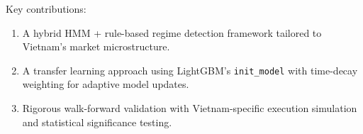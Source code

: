 \documentclass[12pt,a4paper]{article}
\begin{document}
Key contributions:
\begin{enumerate}
    \item A hybrid HMM + rule-based regime detection framework tailored
          to Vietnam's market microstructure.
    \item A transfer learning approach using LightGBM's \texttt{init\_model}
          with time-decay weighting for adaptive model updates.
    \item Rigorous walk-forward validation with Vietnam-specific execution
          simulation and statistical significance testing.
\end{enumerate}


\end{document}

